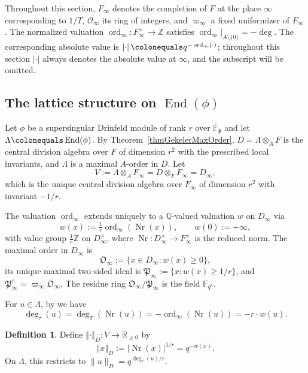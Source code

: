 \documentclass[12pt]{amsart}
\theoremstyle{definition}
\newtheorem{defn}[thm]{Definition}
\theoremstyle{remark}
\numberwithin{equation}{section}
\numberwithin{thm}{section}
\DeclareMathOperator{\End}{End}
\DeclareMathOperator{\ord}{ord}
\DeclareMathOperator{\Nr}{Nr}
\newcommand{\fO}{\mathfrak{O}}
\newcommand{\fP}{\mathfrak{P}}
\newcommand{\fp}{\mathfrak{p}}
\newcommand{\cO}{\mathcal{O}}
\newcommand{\F}{\mathbb{F}}
\newcommand{\Q}{\mathbb{Q}}
\newcommand{\R}{\mathbb{R}}
\newcommand{\Z}{\mathbb{Z}}
\newcommand{\Fi}{F_\infty}
\newcommand{\oF}{\overline{\F}}
\newcommand{\La}{\Lambda}
\newcommand{\norm}[1]{\left\Vert#1\right\Vert}
\newcommand{\abs}[1]{\left|#1\right|}
\begin{document}
	Throughout this section, $\Fi$ denotes the completion of $F$ at the place $\infty$ corresponding to $1/T$, $\cO_\infty$ its ring of integers, and $\varpi_\infty$ a fixed uniformizer of $\Fi$. The normalized valuation $\ord_\infty\colon \Fi^\times \to \Z$ satisfies $\ord_\infty|_{A\setminus\{0\}} = -\deg$. The corresponding absolute value is $\abs{\cdot} \colonequals q^{-\ord_\infty(\cdot)}$; throughout this section $\abs{\cdot}$ always denotes the absolute value at $\infty$, and the subscript will be omitted.
	
	\subsection{The lattice structure on \texorpdfstring{$\End(\phi)$}{End(phi)}}\label{sub:lattice-structure}
	
	Let $\phi$ be a supersingular Drinfeld module of rank $r$ over $\oF_\fp$ and let $\La \colonequals \End(\phi)$. By Theorem~\ref{thmGekelerMaxOrder}, $D = \La \otimes_A F$ is the central division algebra over $F$ of dimension $r^2$ with the prescribed local invariants, and $\La$ is a maximal $A$-order in $D$. Let
	\[
	V := \La \otimes_A \Fi = D \otimes_F \Fi = D_\infty,
	\]
	which is the unique central division algebra over $\Fi$ of dimension $r^2$ with invariant $-1/r$.
	
	The valuation $\ord_\infty$ extends uniquely to a $\Q$-valued valuation $w$ on $D_\infty$ via
	\[
	w(x) := \tfrac{1}{r} \ord_\infty(\Nr(x)), \qquad w(0) := +\infty,
	\]
	with value group $\tfrac{1}{r}\Z$ on $D_\infty^\times$, where $\Nr\colon D_\infty^\times\to \Fi^\times$ is the reduced norm. The maximal order in $D_\infty$ is
	\[
	\fO_\infty := \{x \in D_\infty : w(x) \geq 0\},
	\]
	its unique maximal two-sided ideal is $\fP_\infty := \{x : w(x) \geq 1/r\}$, and $\fP_\infty^r = \varpi_\infty \fO_\infty$. The residue ring $\fO_\infty/\fP_\infty$ is the field $\F_{q^r}$. 
	
	For $u\in \La$, by \cite[Lem.~3.10]{Gekeler91} we have
	\[
	\deg_\tau(u) = \deg_T (\Nr(u)) = - \ord_\infty(\Nr(u)) = -r \cdot w(u).
	\]
	
	\begin{defn}\label{def:norm}
		Define $\norm{\cdot}_D \colon V \to \R_{\geq 0}$ by
		\[
		\norm{x}_D := \abs{\Nr(x)}^{1/r} = q^{-w(x)}.
		\]
		On $\La$, this restricts to $\|u\|_D = q^{\deg_\tau(u)/r}$.
	\end{defn}
	
\end{document}
